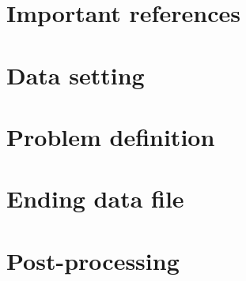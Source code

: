 \documentclass[a4paper,11pt,english]{report}
\begin{document}
%
\chapter{Important references}
%




%
\chapter{Data setting}
%




%
\chapter{Problem definition}
%




%
\chapter{Ending data file}
%




%
\chapter{Post-processing}
%

\end{document}
